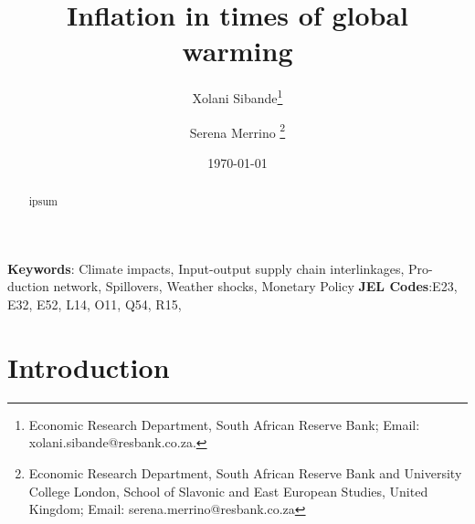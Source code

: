 \documentclass[
  letterpaper,
  DIV=11,
  numbers=noendperiod]{scrartcl}
\author{}
\date{}
\begin{document}
\title{Inflation in times of global warming}


\author {Xolani Sibande\footnote{Economic Research Department, South African Reserve Bank; Email: xolani.sibande@resbank.co.za.} \and
Serena Merrino \footnote{Economic Research Department, South African Reserve Bank and University College London, School of Slavonic and East European Studies, United Kingdom; Email: serena.merrino@resbank.co.za}}


\date{\today}
\maketitle

\begin{abstract}
ipsum

\end{abstract}

\noindent\textbf{Keywords}: Climate impacts, Input-output supply chain interlinkages, Pro-
duction network, Spillovers, Weather shocks, Monetary Policy
\textbf{JEL Codes}:E23, E32, E52, L14, O11, Q54, R15,
\newpage

\section{Introduction}\label{introduction}
\end{document}

